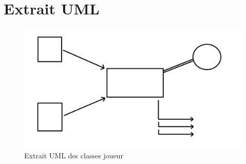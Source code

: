 \chapter{Extrait UML}

\begin{figure}[!h]
\begin{center}
\includegraphics[width=15cm]{presentation/schema}
\end{center}
\caption{Extrait UML des classes joueur}
\end{figure}
